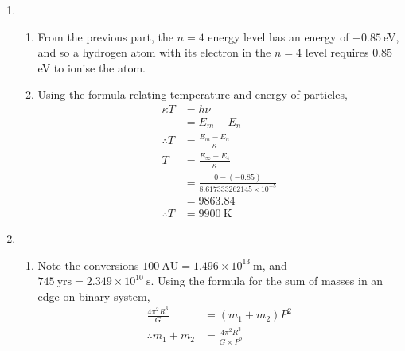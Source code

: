 \documentclass[a4paper,11pt]{article}
\newcommand{\ds}{\displaystyle}
\begin{document}
{{\begin{enumerate}[leftmargin=*]
\begin{enumerate}[label=\alph*)]
\begin{align*}
					\lambda & = \frac{hc}{E_4 - E_2} \\
							& = \frac{4.135667696 \times 10^{-15} \times 3 \times 10^{17}}{2.55} \\
							& = 486.549 \\
					\therefore \lambda & = 490 \: \text{nm}, \\
					\lambda & = \frac{hc}{E_5 - E_2} \\
							& = \frac{4.135667696 \times 10^{-15} \times 3 \times 10^{17}}{2.856} \\
							& = 434.4188756 \\
					\therefore \lambda & = 430 \: \text{nm}.
				\end{align*}
			\item These Balmer series transitions fall under the Visible Light part of the spectrum.
		\end{enumerate}
		\item \begin{enumerate}[label=\alph*)]
			\item From the previous part, the $\ds{n=4}$ energy level has an energy of $\ds{-0.85\:}$eV, and so a hydrogen atom with its electron in the $\ds{n=4}$ level requires $\ds{0.85\:}$eV to ionise the atom.
			\item Using the formula relating temperature and energy of particles,
				\begin{align*}
					\kappa T & = h \nu \\
							 & = E_m - E_n \\
					\therefore T & = \frac{E_m - E_n}{\kappa} \\
					T & = \frac{E_{\infty} - E_4}{\kappa} \\
					  & = \frac{0 - (-0.85)}{8.617333262145\times10^{-5}} \\
					  & = 9863.84 \\
					\therefore T & = 9900\: \text{K}
				\end{align*}
		\end{enumerate}
		\item \begin{enumerate}[label=\alph*)]
			\item Note the conversions $\ds{100\:\text{AU} = 1.496\times 10^{13}\: \text{m}}$, and $\ds{745\:\text{yrs} = 2.349 \times 10^{10}\: \text{s}}$. Using the formula for the sum of masses in an edge-on binary system, 
				\begin{align*}
					\frac{4\pi^2 R^3}{G} & = (m_1+m_2)P^2 \\
					\therefore m_1 + m_2 & = \frac{4\pi^2 R^3}{G\times P^2} \\

\end{align*}
\end{enumerate}
\end{enumerate}}}
\end{document}
